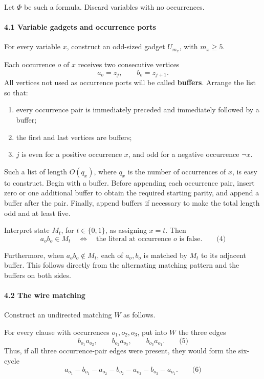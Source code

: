 \documentclass[
  11pt,
  a4paper,
]{article}
\providecommand{\tightlist}{%
  \setlength{\itemsep}{0pt}\setlength{\parskip}{0pt}}
\begin{document}
Let \(\Phi\) be such a formula. Discard variables with no occurrences.

\paragraph{4.1 Variable gadgets and occurrence
ports}\label{variable-gadgets-and-occurrence-ports}

For every variable \(x\), construct an odd-sized gadget \(U_{m_x}\),
with \(m_x\ge5\).

Each occurrence \(o\) of \(x\) receives two consecutive vertices \[
a_o=z_j,\qquad b_o=z_{j+1}.
\] All vertices not used as occurrence ports will be called
\textbf{buffers}. Arrange the list so that:

\begin{enumerate}
\def\labelenumi{\arabic{enumi}.}
\tightlist
\item
  every occurrence pair is immediately preceded and immediately followed
  by a buffer;
\item
  the first and last vertices are buffers;
\item
  \(j\) is even for a positive occurrence \(x\), and odd for a negative
  occurrence \(\neg x\).
\end{enumerate}

Such a list of length \(O(q_x)\), where \(q_x\) is the number of
occurrences of \(x\), is easy to construct. Begin with a buffer. Before
appending each occurrence pair, insert zero or one additional buffer to
obtain the required starting parity, and append a buffer after the pair.
Finally, append buffers if necessary to make the total length odd and at
least five.

Interpret state \(M_t\), for \(t\in\{0,1\}\), as assigning \(x=t\). Then
\[
a_ob_o\in M_t
\quad\Longleftrightarrow\quad
\text{the literal at occurrence }o\text{ is false}. \qquad\text{(4)}
\]

Furthermore, when \(a_ob_o\notin M_t\), each of \(a_o,b_o\) is matched
by \(M_t\) to its adjacent buffer. This follows directly from the
alternating matching pattern and the buffers on both sides.

\paragraph{4.2 The wire matching}\label{the-wire-matching}

Construct an undirected matching \(W\) as follows.

For every clause with occurrences \(o_1,o_2,o_3\), put into \(W\) the
three edges \[
b_{o_1}a_{o_2},\qquad
b_{o_2}a_{o_3},\qquad
b_{o_3}a_{o_1}. \qquad\text{(5)}
\] Thus, if all three occurrence-pair edges were present, they would
form the six-cycle \[
a_{o_1}-b_{o_1}-a_{o_2}-b_{o_2}
-a_{o_3}-b_{o_3}-a_{o_1}. \qquad\text{(6)}
\]
\end{document}
